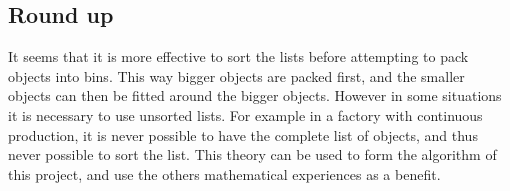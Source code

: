 \subsection{Round up}
It seems that it is more effective to sort the lists before attempting to pack objects into bins. This way bigger objects are packed first, and the smaller objects can then be fitted around the bigger objects. However in some situations it is necessary to use unsorted lists. For example in a factory with continuous production, it is never possible to have the complete list of objects, and thus never possible to sort the list. This theory can be used to form the algorithm of this project, and use the others mathematical experiences as a benefit.
